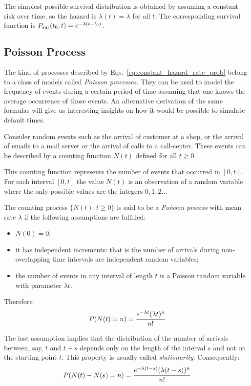 \label{sec:constant_hazard_rate}
The simplest possible survival distribution is obtained by assuming a constant risk over time, so the hazard is $\lambda (t)=\lambda$ for all $t$. The corresponding survival function is $P_{\text{sur}}(t_0, t) = e^{-\lambda (t-t_0)}$.

\subsection{Poisson Process}
\label{sec:poisson_process}

The kind of processes described by Eqs.~\ref{eq:constant_hazard_rate_prob} belong to a class of models called \emph{Poisson processes}. 
They can be used to model the frequency of events during a certain period of time assuming that one knows the average occurrence of those events. An alternative derivation of the same formulas will give us interesting insights on how it would be possible to simulate default times.

Consider random events such as the arrival of customer at a shop, or the arrival of emails to a mail server or the arrival of calls to a call-center. These events can be described by a counting function $N(t)$ defined for all $t\ge 0$.

This counting function represents the number of events that occurred in $[0, t]$. For each interval $[0,t]$ the value $N(t)$ is an observation of a random variable where the only possible values are the integers $0, 1, 2\ldots$

The counting process $\{N(t):t\ge 0\}$ is said to be a \emph{Poisson process} with mean rate $\lambda$ if the following assumptions are fulfilled:
\begin{itemize}
\item $N(0)=0$;
\item it has independent increments: that is the number of arrivals during non-overlapping time intervals are independent random variables;
\item the number of events in any interval of length $t$ is a Poisson random variable with parameter $\lambda t$.
\end{itemize}

Therefore
\begin{equation}
P(N(t)=n)=\cfrac{e^{-\lambda t}(\lambda t)^n}{n!}
\label{eq:poisson_pdf}
\end{equation}

The last assumption implies that the distribution of the number of arrivals between, say, $t$ and $t+s$ depends only on the length of the interval $s$ and not on the starting point $t$. This property is usually called \emph{stationarity}. Consequently:
\begin{equation}
P(N(t)-N(s)=n)=\cfrac{e^{-\lambda (t-s)}(\lambda (t-s))^n}{n!}
\end{equation}

